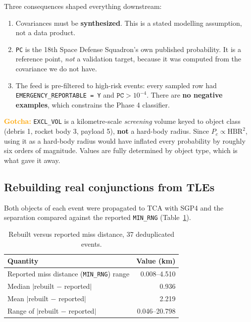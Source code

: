 \documentclass[11pt]{article}
\newcommand{\Pc}{P_c}
\newcommand{\gotcha}[1]{\textcolor{orange}{\textbf{Gotcha:}} #1}
\begin{document}
Three consequences shaped everything downstream:
\begin{enumerate}
  \item Covariances must be \textbf{synthesized}. This is a stated
        modelling assumption, not a data product.
  \item \texttt{PC} is the 18th Space Defense Squadron's own published
        probability. It is a reference point, \emph{not} a validation
        target, because it was computed from the covariance we do not
        have.
  \item The feed is pre-filtered to high-risk events: every sampled row
        had \texttt{EMERGENCY\_REPORTABLE = Y} and $\texttt{PC} > 10^{-4}$.
        There are \textbf{no negative examples}, which constrains the
        Phase 4 classifier.
\end{enumerate}

\gotcha{\texttt{EXCL\_VOL} is a kilometre-scale \emph{screening} volume
keyed to object class (debris 1, rocket body 3, payload 5), \textbf{not} a
hard-body radius. Since $\Pc \propto \text{HBR}^2$, using it as a hard-body
radius would have inflated every probability by roughly six orders of
magnitude. Values are fully determined by object type, which is what gave
it away.}

\subsection{Rebuilding real conjunctions from TLEs}

Both objects of each event were propagated to TCA with SGP4 and the
separation compared against the reported \texttt{MIN\_RNG}
(Table~\ref{tab:rebuild}).

\begin{table}[htbp]
\centering
\caption{Rebuilt versus reported miss distance, 37 deduplicated events.}
\label{tab:rebuild}
\begin{tabular}{lr}
\toprule
Quantity & Value (\si{\kilo\meter}) \\
\midrule
Reported miss distance (\texttt{MIN\_RNG}) range & 0.008--4.510 \\
Median $|$rebuilt $-$ reported$|$ & 0.936 \\
Mean $|$rebuilt $-$ reported$|$ & 2.219 \\
Range of $|$rebuilt $-$ reported$|$ & 0.046--20.798 \\
\bottomrule
\end{tabular}
\end{table}
\end{document}
